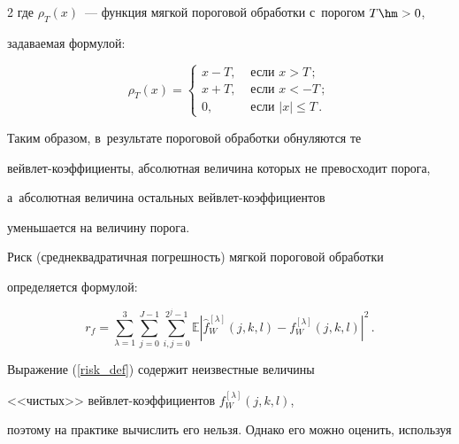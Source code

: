 \begin{multicols}{2}
где $\rho_T(x)$~--- функция мягкой пороговой обработки с~порогом $T\hm>0$, 

задаваемая формулой:

\begin{equation*}

    \label{soft_function}

        \rho_T(x)=

            \begin{cases}

                x-T, &\mbox{ если }x > T\,;\\

                x+T, &\mbox{ если }x < -T\,;\\

                0, &\mbox{ если } \left|x\right|  \leqslant T\,.

            \end{cases}

\end{equation*}

Таким образом, в~результате пороговой обработки обнуляются те 

вейв\-лет-ко\-эф\-фи\-ци\-ен\-ты, абсолютная величина которых не превосходит порога, 

а~абсолютная величина остальных вейв\-лет-ко\-эф\-фи\-ци\-ен\-тов 

уменьшается на величину порога.



Риск (среднеквадратичная погрешность) мягкой пороговой обработки 

определяется формулой:

\begin{equation}

    \label{risk_def}

        r_f= \sum\limits_{\lambda=1}^{3}\sum\limits_{j=0}^{J-1}

        \sum\limits_{i,j=0}^{2^j-1}{\mathbb{E}\left|\hat{f}^{[\lambda]}_W(j,k,l)

        -f^{[\lambda]}_W(j,k,l)\right|^2}\,.

\end{equation}

Выражение (\ref{risk_def}) содержит неизвестные величины 

<<чистых>> вейв\-лет-ко\-эф\-фи\-ци\-ен\-тов $f^{[\lambda]}_W(j,k,l)$, 

поэтому на практике вычислить его нельзя. Однако его можно оценить, используя 


\end{multicols}
